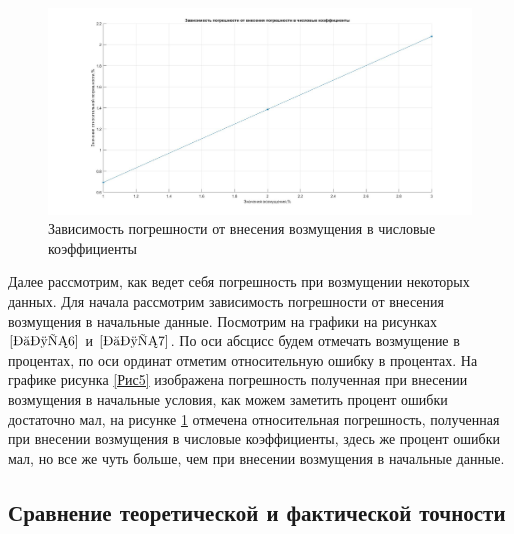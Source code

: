 \documentclass[a4paper]{article}
\begin{document}
\begin{figure}[h!]
\begin{center}
\includegraphics[scale=0.3]{зависимость погрешности от внесения возмущения в числовые коэффициенты.jpg}   
\end{center}
\caption{Зависимость погрешности от внесения возмущения в числовые коэффициенты} \label{Рис7}
\end{figure}
Далее рассмотрим, как ведет себя погрешность при возмущении некоторых данных. Для начала рассмотрим зависимость погрешности от внесения возмущения в начальные данные. Посмотрим на графики на рисунках $\ref{Рис6}$ и $\ref{Рис7}  $. По оси абсцисс будем отмечать возмущение в процентах, по оси ординат отметим относительную ошибку в процентах. На графике рисунка \ref{Рис5} изображена погрешность полученная при внесении возмущения в начальные условия, как можем заметить процент ошибки достаточно мал, на рисунке \ref{Рис7} отмечена относительная погрешность, полученная при внесении возмущения в числовые коэффициенты, здесь же процент ошибки мал, но все же чуть больше, чем при внесении возмущения в начальные данные.

\subsection{Сравнение теоретической и фактической точности} 
\end{document}
